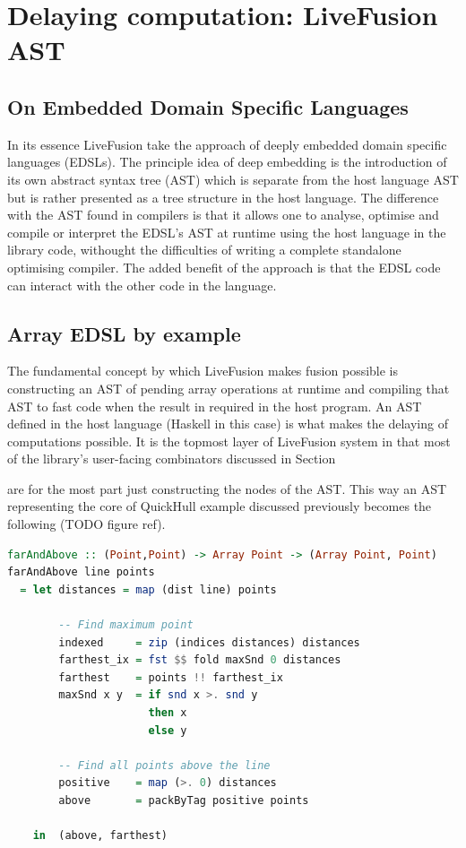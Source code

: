 \documentclass[preamble.tex]{subfiles}
\begin{document}
\pagebreak

\chapter{Delaying computation: LiveFusion AST}

\section{On Embedded Domain Specific Languages}
In its essence LiveFusion take the approach of deeply embedded domain specific languages (EDSLs). The principle idea of deep embedding is the introduction of its own abstract syntax tree (AST) which is separate from the host language AST but is rather presented as a tree structure in the host language. The difference with the AST found in compilers is that it allows one to analyse, optimise and compile or interpret the EDSL's AST at runtime using the host language in the library code, withought the difficulties of writing a complete standalone optimising compiler. The added benefit of the approach is that the EDSL code can interact with the other code in the language. 

\section{Array EDSL by example}
The fundamental concept by which LiveFusion makes fusion possible is constructing an AST of pending array operations at runtime and compiling that AST to fast code when the result in required in the host program. An AST defined in the host language (Haskell in this case) is what makes the delaying of computations possible. It is the topmost layer of LiveFusion system in that most of the library's user-facing combinators discussed in Section  are for the most part just constructing the nodes of the AST. This way an AST representing the core of QuickHull example discussed previously becomes the following (TODO figure ref).

\begin{lstlisting}[basicstyle={\ttfamily},language=Haskell]
farAndAbove :: (Point,Point) -> Array Point -> (Array Point, Point)
farAndAbove line points
  = let distances = map (dist line) points

        -- Find maximum point
        indexed     = zip (indices distances) distances
        farthest_ix = fst $$ fold maxSnd 0 distances
        farthest    = points !! farthest_ix
        maxSnd x y  = if snd x >. snd y
                      then x
                      else y

        -- Find all points above the line
        positive    = map (>. 0) distances
        above       = packByTag positive points

    in  (above, farthest)
\end{lstlisting}
\end{document}
